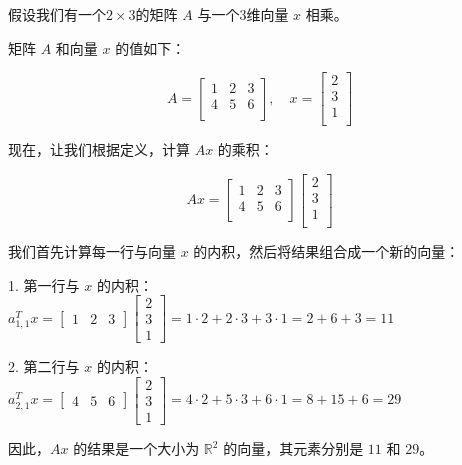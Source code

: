 \begin{exercise}
    假设我们有一个$2\times 3$的矩阵 $A$ 与一个3维向量 $x$ 相乘。

矩阵 $A$ 和向量 $x$ 的值如下：

\begin{equation*}
A = \begin{bmatrix}
1 & 2 & 3 \\
4 & 5 & 6 \\
\end{bmatrix},\quad
x = \begin{bmatrix}
2 \\
3 \\
1 \\
\end{bmatrix}
\end{equation*}

现在，让我们根据定义，计算 $Ax$ 的乘积：

\begin{equation*}
Ax = \begin{bmatrix}
1 & 2 & 3 \\
4 & 5 & 6 \\
\end{bmatrix} \begin{bmatrix}
2 \\
3 \\
1 \\
\end{bmatrix}
\end{equation*}

我们首先计算每一行与向量 $x$ 的内积，然后将结果组合成一个新的向量：

1. 第一行与 $x$ 的内积： $a_{1,1}^T x = \begin{bmatrix} 1 & 2 & 3 \end{bmatrix} \begin{bmatrix} 2 \\ 3 \\ 1 \end{bmatrix} = 1 \cdot 2 + 2 \cdot 3 + 3 \cdot 1 = 2 + 6 + 3 = 11$

2. 第二行与 $x$ 的内积： $a_{2,1}^T x = \begin{bmatrix} 4 & 5 & 6 \end{bmatrix} \begin{bmatrix} 2 \\ 3 \\ 1 \end{bmatrix} = 4 \cdot 2 + 5 \cdot 3 + 6 \cdot 1 = 8 + 15 + 6 = 29$

因此，$Ax$ 的结果是一个大小为 $\mathbb{R}^2$ 的向量，其元素分别是 $11$ 和 $29$。
\end{exercise}

